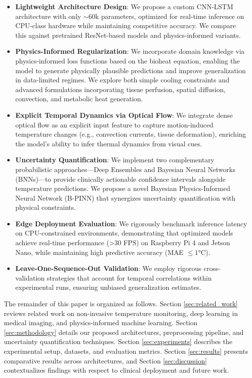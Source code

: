 \begin{itemize}
    \item \textbf{Lightweight Architecture Design}: We propose a custom CNN-LSTM architecture with only $\sim$60k parameters, optimized for real-time inference on CPU-class hardware while maintaining competitive accuracy.
    We compare this against pretrained ResNet-based models and physics-informed variants.

    \item \textbf{Physics-Informed Regularization}: We incorporate domain knowledge via physics-informed loss functions based on the bioheat equation, enabling the model to generate physically plausible predictions and improve generalization in data-limited regimes.
    We explore both simple cooling constraints and advanced formulations incorporating tissue perfusion, spatial diffusion, convection, and metabolic heat generation.

    \item \textbf{Explicit Temporal Dynamics via Optical Flow}: We integrate dense optical flow as an explicit input feature to capture motion-induced temperature changes (e.g., convection currents, tissue deformation), enriching the model's ability to infer thermal dynamics from visual cues.

    \item \textbf{Uncertainty Quantification}: We implement two complementary probabilistic approaches---Deep Ensembles and Bayesian Neural Networks (BNNs)---to provide clinically actionable confidence intervals alongside temperature predictions. We propose a novel Bayesian Physics-Informed Neural Network (B-PINN) that synergizes uncertainty quantification with physical constraints.

    \item \textbf{Edge Deployment Evaluation}: We rigorously benchmark inference latency on CPU-constrained environments, demonstrating that optimized models achieve real-time performance (>30 FPS) on Raspberry Pi 4 and Jetson Nano, while maintaining high predictive accuracy (MAE $\le 1°$C).

    \item \textbf{Leave-One-Sequence-Out Validation}: We employ rigorous cross-validation strategies that account for temporal correlations within experimental runs, ensuring unbiased generalization estimates.
\end{itemize}

The remainder of this paper is organized as follows. Section \ref{sec:related_work} reviews related work on non-invasive temperature monitoring, deep learning in medical imaging, and physics-informed machine learning.
 Section \ref{sec:methodology} details our proposed architectures, preprocessing pipeline, and uncertainty quantification techniques. Section \ref{sec:experiments} describes the experimental setup, datasets, and evaluation metrics. Section \ref{sec:results} presents comparative results across architectures, and Section \ref{sec:discussion} contextualizes findings with respect to clinical deployment and future work.
